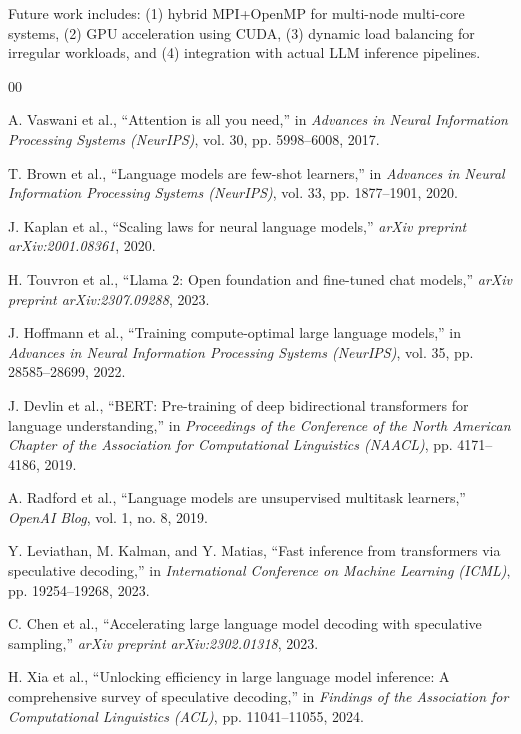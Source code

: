 \documentclass[conference]{IEEEtran}
\begin{document}
Future work includes: (1) hybrid MPI+OpenMP for multi-node multi-core systems, (2) GPU acceleration using CUDA, (3) dynamic load balancing for irregular workloads, and (4) integration with actual LLM inference pipelines.


\begin{thebibliography}{00}

A. Vaswani et al., ``Attention is all you need,'' in \textit{Advances in Neural Information Processing Systems (NeurIPS)}, vol. 30, pp. 5998--6008, 2017.

T. Brown et al., ``Language models are few-shot learners,'' in \textit{Advances in Neural Information Processing Systems (NeurIPS)}, vol. 33, pp. 1877--1901, 2020.

J. Kaplan et al., ``Scaling laws for neural language models,'' \textit{arXiv preprint arXiv:2001.08361}, 2020.

H. Touvron et al., ``Llama 2: Open foundation and fine-tuned chat models,'' \textit{arXiv preprint arXiv:2307.09288}, 2023.

J. Hoffmann et al., ``Training compute-optimal large language models,'' in \textit{Advances in Neural Information Processing Systems (NeurIPS)}, vol. 35, pp. 28585--28699, 2022.

J. Devlin et al., ``BERT: Pre-training of deep bidirectional transformers for language understanding,'' in \textit{Proceedings of the Conference of the North American Chapter of the Association for Computational Linguistics (NAACL)}, pp. 4171--4186, 2019.

A. Radford et al., ``Language models are unsupervised multitask learners,'' \textit{OpenAI Blog}, vol. 1, no. 8, 2019.

Y. Leviathan, M. Kalman, and Y. Matias, ``Fast inference from transformers via speculative decoding,'' in \textit{International Conference on Machine Learning (ICML)}, pp. 19254--19268, 2023.

C. Chen et al., ``Accelerating large language model decoding with speculative sampling,'' \textit{arXiv preprint arXiv:2302.01318}, 2023.

H. Xia et al., ``Unlocking efficiency in large language model inference: A comprehensive survey of speculative decoding,'' in \textit{Findings of the Association for Computational Linguistics (ACL)}, pp. 11041--11055, 2024.


\end{thebibliography}
\end{document}
